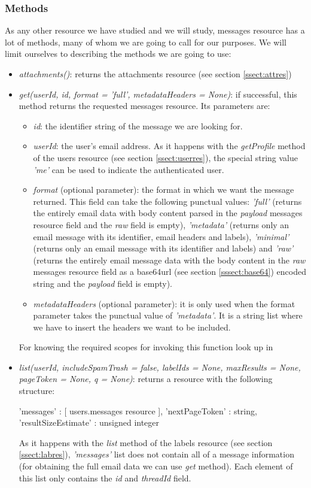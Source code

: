 \subsubsection{Methods}
As any other resource we have studied and we will study, messages resource has a lot of methods, many of whom we are going to call for our purposes. We will limit ourselves to describing the methods we are going to use:

\begin{itemize}
	\item\textit{attachments()}: returns the attachments resource (see section \ref{ssect:attres})
	\item\textit{get(userId, id, format = 'full', metadataHeaders = None)}: if successful, this method returns the requested messages resource. Its parameters are:
	\begin{itemize}
		\item\textit{id}: the identifier string of the message we are looking for.
		\item\textit{userId}: the user's email address. As it happens with the \textit{getProfile} method of the users resource (see section \ref{ssect:userres}), the special string value \textit{'me'} can be used to indicate the authenticated user.
		\item\textit{format} (optional parameter): the format in which we want the message returned. This field can take the following punctual values: \textit{'full'} (returns the entirely email data with body content parsed in the \textit{payload} messages resource field and the \textit{raw} field is empty), \textit{'metadata'} (returns only an email message with its identifier, email headers and labels), \textit{'minimal'} (returns only an email message with its identifier and labels) and \textit{'raw'} (returns the entirely email message data with the body content in the \textit{raw} messages resource field as a base64url (see section \ref{sssect:base64}) encoded string and the \textit{payload} field is empty).
		\item\textit{metadataHeaders} (optional parameter): it is only used when the format parameter takes the punctual value of \textit{'metadata'}. It is a string list where we have to insert the headers we want to be included.
	\end{itemize}
	For knowing the required scopes for invoking this function look up in \cite[/v1/reference/users/messages/get]{gmailAPI}
	\item\textit{list(userId, includeSpamTrash = false, labelIds = None, maxResults = None, pageToken = None, q = None)}: returns a resource with the following structure:
	\begin{python}
		{
		'messages' : [ users.messages resource ],
		'nextPageToken' : string,
		'resultSizeEstimate' : unsigned integer
		}
	\end{python}
	As it happens with the \textit{list} method of the labels resource (see section \ref{ssect:labres}), \textit{'messages'} list does not contain all of a message information (for obtaining the full email data we can use \textit{get} method). Each element of this list only contains the \textit{id} and \textit{threadId} field.
	

\end{itemize}
